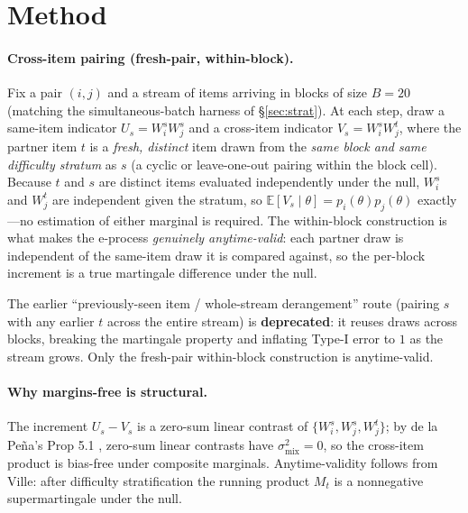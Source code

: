 \documentclass{article}
\begin{document}
\section{Method}
\label{sec:method}

\paragraph{Cross-item pairing (fresh-pair, within-block).}
Fix a pair $(i,j)$ and a stream of items arriving in blocks of size
$B=20$ (matching the simultaneous-batch harness of \S\ref{sec:strat}). At each
step, draw a same-item indicator $U_s = W_i^s W_j^s$ and a cross-item indicator
$V_s = W_i^s W_j^t$, where the partner item $t$ is a \emph{fresh, distinct} item
drawn from the \emph{same block and same difficulty stratum} as $s$ (a cyclic or
leave-one-out pairing within the block cell). Because $t$ and $s$ are distinct
items evaluated independently under the null, $W_i^s$ and $W_j^t$ are independent
given the stratum, so $\mathbb{E}[V_s \mid \theta] = p_i(\theta) p_j(\theta)$
exactly---no estimation of either marginal is required. The within-block
construction is what makes the e-process \emph{genuinely anytime-valid}: each
partner draw is independent of the same-item draw it is compared against, so the
per-block increment is a true martingale difference under the null.

The earlier ``previously-seen item / whole-stream derangement'' route (pairing
$s$ with any earlier $t$ across the entire stream) is \textbf{deprecated}: it
reuses draws across blocks, breaking the martingale property and inflating
Type-I error to $1$ as the stream grows. Only the fresh-pair within-block
construction is anytime-valid.

\paragraph{Why margins-free is structural.}
The increment $U_s - V_s$ is a zero-sum linear contrast of $\{W_i^s, W_j^s,
W_j^t\}$; by de la Pe\~na's Prop 5.1 \citep{delapena2606}, zero-sum linear
contrasts have $\sigma^2_{\mathrm{mix}}=0$, so the cross-item product is
bias-free under composite marginals. Anytime-validity follows from Ville: after
difficulty stratification the running product $M_t$ is a nonnegative
supermartingale under the null.
\end{document}
